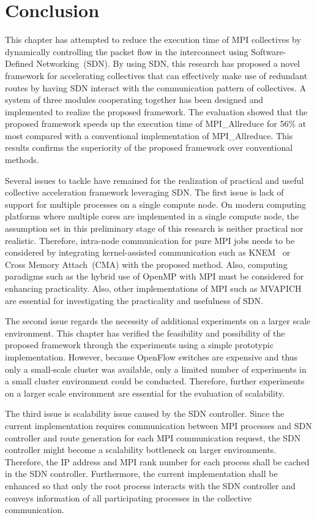 \section{Conclusion}\label{sec:iii-conclusion}

This chapter has attempted to reduce the execution time of MPI
collectives by dynamically controlling the packet flow in the interconnect
using Software-Defined Networking~(SDN).
By using SDN, this research  has proposed a novel framework for accelerating
collectives that can effectively make use of redundant routes by having SDN
interact with the communication pattern of collectives. A system of three
modules cooperating together has been designed and implemented to realize the
proposed framework. The evaluation showed that the proposed framework speeds
up the execution time of MPI\_Allreduce for 56\% at most compared with a
conventional implementation of MPI\_Allreduce. This results confirms the
superiority of the proposed framework over conventional methods.

Several issues to tackle have remained for the realization of practical
and useful collective acceleration framework leveraging SDN\@.
The first issue is lack of support for multiple processes on a single compute
node. On modern computing platforms where multiple cores are implemented in a
single compute node, the assumption set in this preliminary stage of this
research is neither practical nor realistic. Therefore, intra-node
communication for pure MPI jobs needs to be considered by integrating
kernel-assisted communication such as KNEM~\autocite{Goglin2013} or Cross
Memory Attach~(CMA) with the proposed method. Also, computing paradigms such
as the hybrid use of OpenMP with MPI must be considered for enhancing
practicality. Also, other implementations of MPI such as
MVAPICH~\autocite{mvapich} are essential for investigating the practicality
and usefulness of SDN\@.

The second issue regards the necessity of additional experiments on a
larger scale environment. This chapter has verified the
feasibility and possibility of the proposed framework
through the experiments using a simple prototypic implementation.
However, because OpenFlow switches are expensive and thus only a small-scale
cluster was available, only a limited number of experiments in a small cluster
environment could be conducted. Therefore, further experiments on a larger
scale environment are essential for the evaluation of scalability.

The third issue is scalability issue caused by the SDN controller.
Since the current implementation requires communication between MPI
processes and SDN controller and route generation for each MPI
communication request, the SDN controller might become a scalability
bottleneck on larger environments. Therefore, the IP address and MPI rank
number for each process shall be cached in the SDN controller. Furthermore,
the current implementation shall be enhanced so that only the root process
interacts with the SDN controller and conveys information of all participating
processes in the collective communication.
